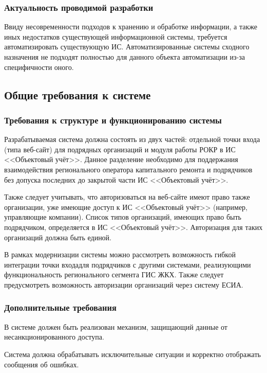 \subsubsection{Актуальность проводимой разработки}

Ввиду несовременности подходов к хранению и обработке информации, а также иных недостатков существующей информационной системы, требуется автоматизировать существующую ИС.
Автоматизированные системы сходного назначения не подходят полностью для данного объекта автоматизации из-за специфичности оного.

\subsection{Общие требования к системе}

\subsubsection{Требования к структуре и функционированию системы}

Разрабатываемая система должна состоять из двух частей: отдельной точки входа (типа веб-сайт) для подрядных организаций и модуля работы РОКР в ИС <<Объектовый учёт>>.
Данное разделение необходимо для поддержания взаимодействия регионального оператора капитального ремонта и подрядчиков без допуска последних до закрытой части ИС <<Объектовый учёт>>.

Также следует учитывать, что авторизоваться на веб-сайте имеют право также организации, уже имеющие доступ к ИС <<Объектовый учёт>> (например, управляющие компании).
Список типов организаций, имеющих право быть подрядчиком, определяется в ИС <<Объектовый учёт>>.
Авторизация для таких организаций должна быть единой.

В рамках модернизации системы можно рассмотреть возможность гибкой интеграции точки входадля подрядчиков с другими системами, реализующими функциональность регионального сегмента ГИС ЖКХ.
Также следует предусмотреть возможность авторизации организаций через систему ЕСИА.

\subsubsection{Дополнительные требования}

В системе должен быть реализован механизм, защищающий данные от несанкционированного доступа.

Система должна обрабатывать исключительные ситуации и корректно отображать сообщения об ошибках.

